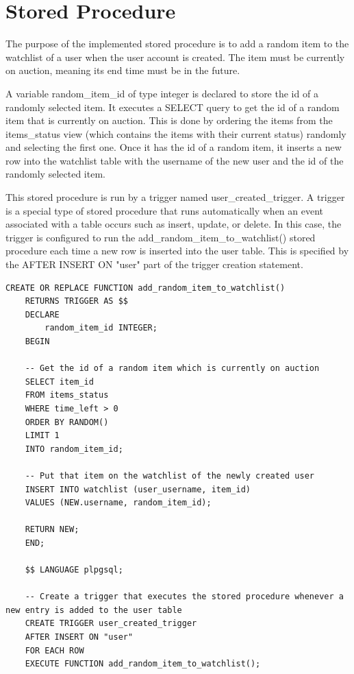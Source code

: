 \section{Stored Procedure}
The purpose of the implemented stored procedure is to add a random item to the watchlist of a user when the user account is created. The item must be currently on auction, meaning its end time must be in the future.

A variable random\_item\_id of type integer is declared to store the id of a randomly selected item. It executes a SELECT query to get the id of a random item that is currently on auction. This is done by ordering the items from the items\_status view (which contains the items with their current status) randomly and selecting the first one. Once it has the id of a random item, it inserts a new row into the watchlist table with the username of the new user and the id of the randomly selected item.

This stored procedure is run by a trigger named user\_created\_trigger. A trigger is a special type of stored procedure that runs automatically when an event associated with a table occurs such as insert, update, or delete. In this case, the trigger is configured to run the add\_random\_item\_to\_watchlist() stored procedure each time a new row is inserted into the user table. This is specified by the AFTER INSERT ON "user" part of the trigger creation statement.

\begin{lstlisting}[style=sqlStyle]
	CREATE OR REPLACE FUNCTION add_random_item_to_watchlist()
	RETURNS TRIGGER AS $$
	DECLARE
		random_item_id INTEGER;
	BEGIN
	
	-- Get the id of a random item which is currently on auction
	SELECT item_id
	FROM items_status
	WHERE time_left > 0
	ORDER BY RANDOM()
	LIMIT 1
	INTO random_item_id;
	
	-- Put that item on the watchlist of the newly created user
	INSERT INTO watchlist (user_username, item_id)
	VALUES (NEW.username, random_item_id);
	
	RETURN NEW;
	END;
	
	$$ LANGUAGE plpgsql;
	
	-- Create a trigger that executes the stored procedure whenever a new entry is added to the user table
	CREATE TRIGGER user_created_trigger
	AFTER INSERT ON "user"
	FOR EACH ROW
	EXECUTE FUNCTION add_random_item_to_watchlist();
\end{lstlisting}
